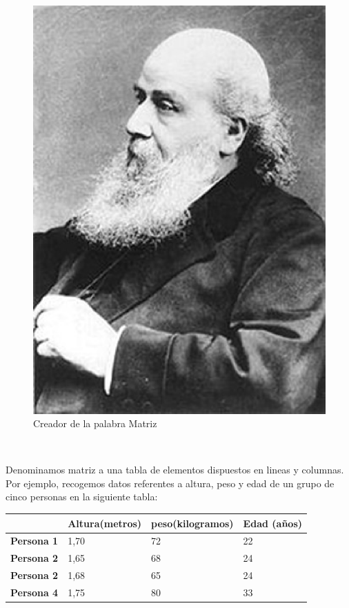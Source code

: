 \documentclass[11pt, conference]{IEEEtran}
\begin{document}
\begin{figure}[h]
	\begin{center}
		\includegraphics[scale=0.15]{img27.eps}
        \caption{Creador de la palabra Matriz\cite{Alfonso2010c}} 
	\end{center}
\end{figure}
\

Denominamos matriz a una tabla de elementos dispuestos en lineas y columnas. Por ejemplo, recogemos datos referentes a altura, peso y edad de un grupo de cinco personas en la siguiente tabla:

\begin{table}[htb]
\begin{center}
\begin{tabular}{|l|l|l|l|}
\hline
 & {\bf Altura}(metros) & {\bf peso}(kilogramos) & {\bf Edad }(años)  \\
\hline \hline
{\bf Persona 1} & 1,70 & 72 & 22 \\ \hline
{\bf Persona 2} & 1,65 & 68 & 24 \\ \hline
{\bf Persona 2} & 1,68 & 65 & 24 \\ \hline
{\bf Persona 4} & 1,75 & 80 & 33 \\ \hline
\end{tabular}
\end{center}
\end{table}
\end{document}
